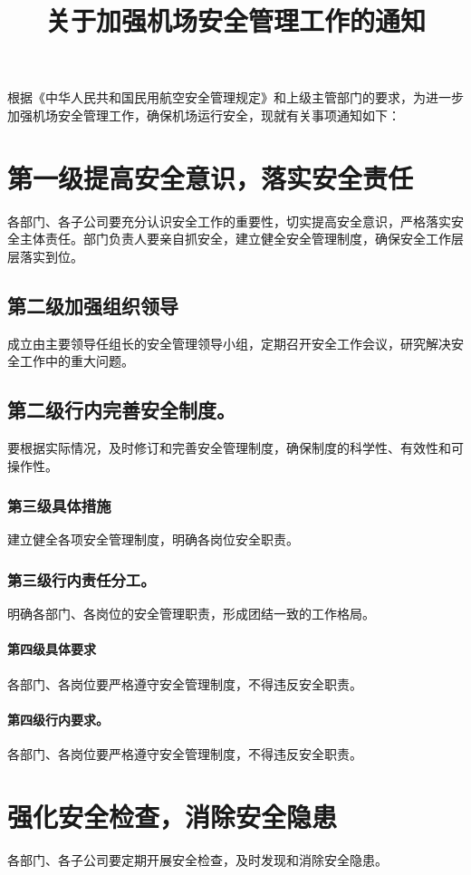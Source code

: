 \documentclass{common-doc}
\title{关于加强机场安全管理工作的通知}
\begin{document}
\maketitle

根据《中华人民共和国民用航空安全管理规定》和上级主管部门的要求，为进一步加强机场安全管理工作，确保机场运行安全，现就有关事项通知如下：

\section{第一级提高安全意识，落实安全责任}
各部门、各子公司要充分认识安全工作的重要性，切实提高安全意识，严格落实安全主体责任。部门负责人要亲自抓安全，建立健全安全管理制度，确保安全工作层层落实到位。

\subsection{第二级加强组织领导}
成立由主要领导任组长的安全管理领导小组，定期召开安全工作会议，研究解决安全工作中的重大问题。

\subsection*{第二级行内完善安全制度。}
要根据实际情况，及时修订和完善安全管理制度，确保制度的科学性、有效性和可操作性。

\subsubsection{第三级具体措施}
建立健全各项安全管理制度，明确各岗位安全职责。

\subsubsection*{第三级行内责任分工。}
明确各部门、各岗位的安全管理职责，形成团结一致的工作格局。

\paragraph{第四级具体要求}
各部门、各岗位要严格遵守安全管理制度，不得违反安全职责。

\paragraph*{第四级行内要求。}
各部门、各岗位要严格遵守安全管理制度，不得违反安全职责。

\section{强化安全检查，消除安全隐患}
各部门、各子公司要定期开展安全检查，及时发现和消除安全隐患。
\end{document}
